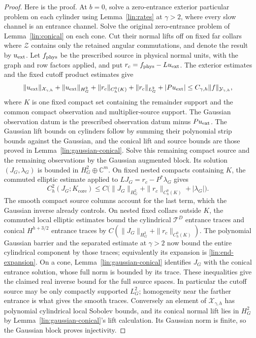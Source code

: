 \begin{proof}
Here is the proof.  At $b=0$, solve a zero-entrance exterior particular
problem on each cylinder using Lemma~\ref{lin:rates} at $\gamma>2$,
where every slow channel is an entrance channel.  Solve the original
zero-entrance problem of Lemma~\ref{lin:conical} on each cone.  Cut their
normal lifts off on fixed far collars where $\mathcal Z$ contains only
the retained angular commutations, and denote the result by $u_{\rm ext}$.
Let $f_{\rm phys}$ be the prescribed source in physical normal units,
with the graph and row factors applied, and put
$r_c=f_{\rm phys}-Lu_{\rm ext}$.
The exterior estimates and the fixed cutoff product estimates give
\[
 \|u_{\rm ext}\|_{\mathcal X_{\gamma,h}}
 +\|u_{\rm ext}\|_{H^2_G}
 +\|r_c\|_{C_h^0(K)}
 +\|r_c\|_{L^2_G}
 +|Pu_{\rm ext}|
 \le C_{\gamma,h}\|f\|_{\mathcal Y_{\gamma,h}},
\]
where $K$ is one fixed compact set containing the remainder support and
the common compact observation and multiplier-source support.  The
Gaussian observation datum is the prescribed observation datum minus
$Pu_{\rm ext}$.  The Gaussian lift bounds on
cylinders follow by summing their polynomial strip bounds against the
Gaussian, and the conical lift and source bounds are those proved in
Lemma~\ref{lin:gaussian-conical}.  Solve this remaining compact source
and the remaining observations by the Gaussian augmented block.
Its solution $(J_G,\lambda_G)$ is bounded in $H^2_G\oplus\mathbb C^m$.
On fixed nested compacts containing $K$, the commuted elliptic estimate
applied to $LJ_G=r_c-P^*\lambda_G$ gives
\[
 C_h^2(J_G;K_{\mathrm{core}})
 \le C\bigl(\|J_G\|_{H^2_G}+\|r_c\|_{C_h^0(K)}+|\lambda_G|\bigr).
\]
The smooth compact source columns account for the last term, which the
Gaussian inverse already controls.
On nested fixed collars outside $K$, the commuted local elliptic estimates
bound the cylindrical $\mathcal T^D$ entrance traces and conical
$H^{h+3/2}$ entrance traces by
$C(\|J_G\|_{H^2_G}+\|r_c\|_{C_h^0(K)})$.
The polynomial Gaussian barrier and the separated estimate at $\gamma>2$
now bound the entire cylindrical component by those traces; equivalently
its expansion is \eqref{lin:end-expansion}.  On a cone,
Lemma~\ref{lin:gaussian-conical} identifies $J_G$ with the conical entrance
solution, whose full norm is bounded by its trace.  These inequalities
give the claimed real inverse bound for the full source spaces.  In
particular the cutoff source may be only compactly supported $L^2_G$;
homogeneity near the farther entrance is what gives the smooth traces.
Conversely an element of
$\mathcal X_{\gamma,h}$ has polynomial cylindrical local Sobolev bounds,
and its conical normal lift lies in $H^2_G$ by
Lemma~\ref{lin:gaussian-conical}'s lift calculation.  Its Gaussian norm
is finite, so the Gaussian block proves injectivity.


\end{proof}

